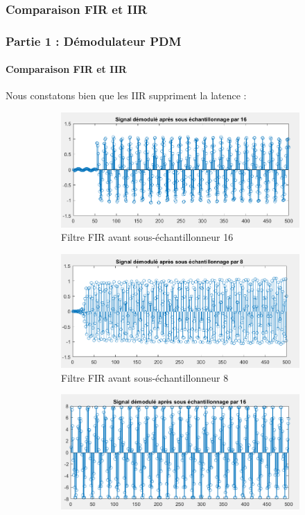 \documentclass[
10pt,
aspectratio=169,
]{beamer}
\begin{document}
\subsubsection{Comparaison FIR et IIR}
\begin{frame}
\frametitle{Partie 1 : Démodulateur PDM} 
\framesubtitle{Comparaison FIR et IIR}  
Nous constatons bien que les IIR suppriment la latence : 
\begin{figure}
\centering
\begin{subfigure}{0.4\textwidth}
    \includegraphics[scale=0.3]{Images/lat_FIR_16.PNG}
    \caption{Filtre FIR avant sous-échantillonneur 16}
\end{subfigure}
\hfill
\begin{subfigure}{0.4\textwidth}
    \includegraphics[scale=0.3]{Images/lat_FIR_8.PNG}
    \caption{Filtre FIR avant sous-échantillonneur 8}
\end{subfigure}
\hfill
\begin{subfigure}{0.4\textwidth}
    \includegraphics[scale=0.3]{Images/lat_IIR_16.PNG}

\end{subfigure}
\end{figure}
\end{frame}
\end{document}
